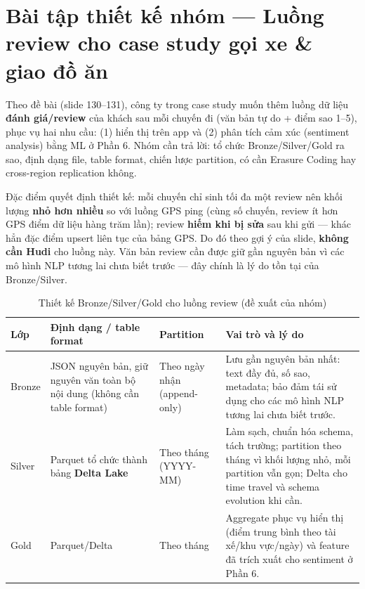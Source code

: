 \documentclass[12pt,a4paper,oneside]{article}
\begin{document}
\section{Bài tập thiết kế nhóm --- Luồng review cho case study gọi xe \& giao đồ ăn}
\label{sec:bainhom}

Theo đề bài (slide 130--131), công ty trong case study muốn thêm luồng dữ liệu \textbf{đánh giá/review} của khách sau mỗi chuyến đi (văn bản tự do + điểm sao 1--5), phục vụ hai nhu cầu: (1) hiển thị trên app và (2) phân tích cảm xúc (sentiment analysis) bằng ML ở Phần 6. Nhóm cần trả lời: tổ chức Bronze/Silver/Gold ra sao, định dạng file, table format, chiến lược partition, có cần Erasure Coding hay cross-region replication không.

Đặc điểm quyết định thiết kế: mỗi chuyến chỉ sinh tối đa một review nên khối lượng \textbf{nhỏ hơn nhiều} so với luồng GPS ping (cùng số chuyến, review ít hơn GPS điểm dữ liệu hàng trăm lần); review \textbf{hiếm khi bị sửa} sau khi gửi --- khác hẳn đặc điểm upsert liên tục của bảng GPS. Do đó theo gợi ý của slide, \textbf{không cần Hudi} cho luồng này. Văn bản review cần được giữ gần nguyên bản vì các mô hình NLP tương lai chưa biết trước --- đây chính là lý do tồn tại của Bronze/Silver.

\begin{table}[H]
\centering
\caption{Thiết kế Bronze/Silver/Gold cho luồng review (đề xuất của nhóm)}
\label{tab:medallion}
\begin{tabularx}{\textwidth}{l X X X}
\toprule
Lớp & Định dạng / table format & Partition & Vai trò và lý do \\
\midrule
Bronze & JSON nguyên bản, giữ nguyên văn toàn bộ nội dung (không cần table format) & Theo ngày nhận (append-only) & Lưu gần nguyên bản nhất: text đầy đủ, số sao, metadata; bảo đảm tái sử dụng cho các mô hình NLP tương lai chưa biết trước. \\
Silver & Parquet tổ chức thành bảng \textbf{Delta Lake} & Theo tháng (YYYY-MM) & Làm sạch, chuẩn hóa schema, tách trường; partition theo tháng vì khối lượng nhỏ, mỗi partition vẫn gọn; Delta cho time travel và schema evolution khi cần. \\
Gold & Parquet/Delta & Theo tháng & Aggregate phục vụ hiển thị (điểm trung bình theo tài xế/khu vực/ngày) và feature đã trích xuất cho sentiment ở Phần 6. \\
\bottomrule
\end{tabularx}
\end{table}
\end{document}
